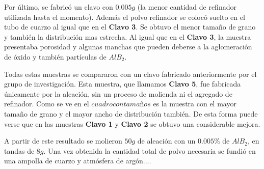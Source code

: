 \documentclass[a4paper,12pt,fleqn,twoside,openany]{book}
\begin{document}
Por último, se fabricó un clavo con $0.005 g$ (la menor cantidad de refinador utilizada hasta el momento). Además el polvo refinador se colocó suelto en el tubo de cuarzo al igual que en el \textbf{Clavo 3}. Se obtuvo el menor tamaño de grano y también la distribución mas estrecha. Al igual que en el \textbf{Clavo 3}, la muestra presentaba porosidad y algunas manchas que pueden deberse a la aglomeración de óxido y también partículas de $AlB_2$.

Todas estas muestras se compararon con un clavo fabricado anteriormente por el grupo de investigación. Esta muestra, que llamamos \textbf{Clavo 5}, fue fabricada únicamente por la aleación, sin un proceso de molienda ni el agregado de refinador. Como se ve en el $cuadro con tamaños$ es la muestra con el mayor tamaño de grano y el mayor ancho de distribución también. De esta forma puede verse que en las muestras \textbf{Clavo 1} y \textbf{Clavo 2} se obtuvo una considerable mejora.   

A partir de este resultado se molieron $50 g$ de aleación con un $0.005\%$ de $AlB_2$, en tandas de $8 g $. Una vez obtenida la cantidad total de polvo necesaria se fundió en una ampolla de cuarzo y atmósfera de argón....  







% 
% 
% 
% 
% 
% 
\end{document}
